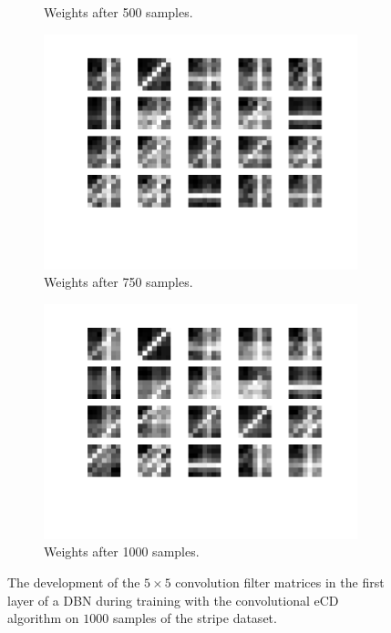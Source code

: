 \begin{figure}[h!]
\begin{subfigure}[t]{.45\textwidth}
  		\caption{Weights after 500 samples.}
  		\label{fig:sub2}
	\end{subfigure}
	\begin{subfigure}[t]{.45\textwidth}
  		\centering
  		\includegraphics[width=.9\linewidth]{imgs/7x7/w4.png}
  		\caption{Weights after 750 samples.}
  		\label{fig:sub2}
	\end{subfigure}
	\begin{subfigure}[t]{.45\textwidth}
  		\centering
  		\includegraphics[width=.9\linewidth]{imgs/7x7/w5.png}
  		\caption{Weights after 1000 samples.}
  		\label{fig:sub2}
	\end{subfigure}
	\caption{The development of the $5 \times 5$ convolution filter matrices in the first layer of a DBN during training with the convolutional eCD algorithm on $1000$ samples of the stripe dataset.}
	\label{fig:stripesdbnw}
\end{figure}




